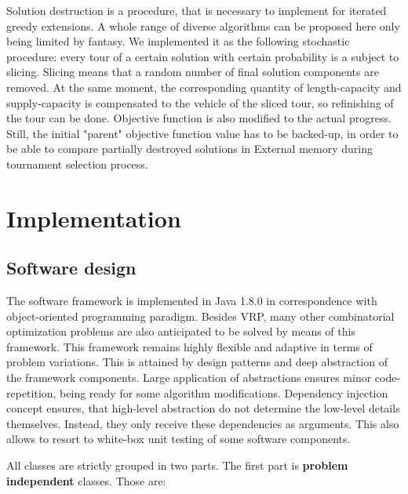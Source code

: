 \documentclass[11pt,a4paper,oneside]{book}
\begin{document}
Solution destruction is a procedure, that is necessary to implement for iterated greedy extensions. A whole range of diverse algorithms can be proposed here only being limited by fantasy. We implemented it as the following stochastic procedure: every tour of a certain solution with certain probability is a subject to slicing. Slicing means that a random number of final solution components are removed. At the same moment, the corresponding quantity of length-capacity and supply-capacity is compensated to the vehicle of the sliced tour, so refinishing of the tour can be done. Objective function is also modified to the actual progress. Still, the initial "parent" objective function value has to be backed-up, in order to be able to compare partially destroyed solutions in External memory during tournament selection process.



\chapter{Implementation}


\section{Software design}

The software framework is implemented in Java 1.8.0 in correspondence with object-oriented programming paradigm. Besides VRP, many other combinatorial optimization problems are also anticipated to be solved by means of this framework. This framework remains highly flexible and adaptive in terms of problem variations. This is attained by design patterns and deep abstraction of the framework components. Large application of abstractions ensures minor code-repetition, being ready for some algorithm modifications. Dependency injection concept ensures, that high-level abstraction do not determine the low-level details themselves. Instead, they only receive these dependencies as arguments. This also allows to resort to white-box unit testing of some software components.

All classes are strictly grouped in two parts. The first part is \textbf{problem independent} classes. Those are:
\end{document}
